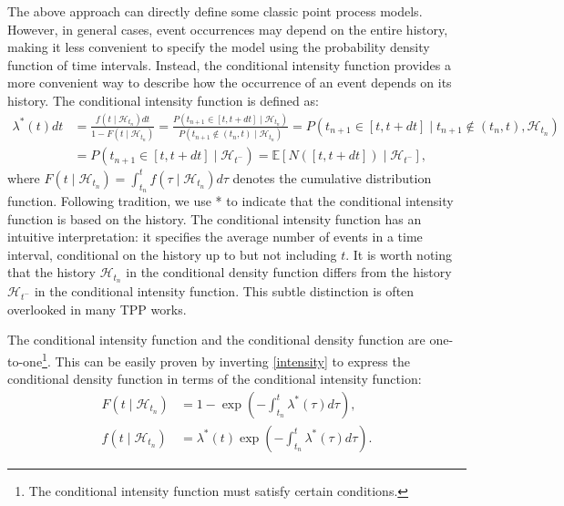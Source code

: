 \documentclass[10pt]{article} %
\begin{document}
The above approach can directly define some classic point process models. However, in general cases, event occurrences may depend on the entire history, making it less convenient to specify the model using the probability density function of time intervals. Instead, the conditional intensity function provides a more convenient way to describe how the occurrence of an event depends on its history. The conditional intensity function is defined as: 
\begin{equation}
\begin{aligned}
    \lambda^*(t)dt&=\frac{f(t \mid \mathcal{H}_{t_n})dt}{1-F(t \mid \mathcal{H}_{t_n})}=\frac{P(t_{n+1}\in [t,t+dt]\mid \mathcal{H}_{t_n})}{P(t_{n+1}\notin (t_n,t)\mid \mathcal{H}_{t_n})}=P(t_{n+1}\in [t,t+dt]\mid t_{n+1}\notin (t_n,t),\mathcal{H}_{t_n})\\
    &=P(t_{n+1}\in [t,t+dt]\mid \mathcal{H}_{t^-})=\mathbb{E}[N([t,t+dt])\mid \mathcal{H}_{t^-}], 
\end{aligned}
\label{intensity}
\end{equation}
where \( F(t \mid \mathcal{H}_{t_n}) = \int_{t_n}^t f(\tau \mid \mathcal{H}_{t_n}) d\tau \) denotes the cumulative distribution function. Following tradition, we use * to indicate that the conditional intensity function is based on the history. 
The conditional intensity function has an intuitive interpretation: it specifies the average number of events in a time interval, conditional on the history up to but not including $t$. 
It is worth noting that the history \(\mathcal{H}_{t_n}\) in the conditional density function differs from the history \(\mathcal{H}_{t^-}\) in the conditional intensity function. This subtle distinction is often overlooked in many TPP works. 

The conditional intensity function and the conditional density function are one-to-one\footnote{The conditional intensity function must satisfy certain conditions.}. This can be easily proven by inverting \cref{intensity} to express the conditional density function in terms of the conditional intensity function: 
\begin{equation}
\begin{aligned}
    F(t \mid \mathcal{H}_{t_n})&=1-\exp\left(-\int_{t_n}^t \lambda^*(\tau)d\tau\right),\\
    f(t \mid \mathcal{H}_{t_n})&=\lambda^*(t)\exp\left(-\int_{t_n}^t \lambda^*(\tau)d\tau\right).
\end{aligned}
\label{con_density}
\end{equation}
\end{document}
